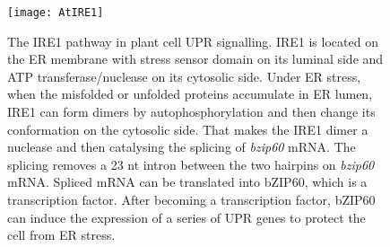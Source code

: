 \begin{figure}
	\centering
	\texttt{[image: AtIRE1]}
	\caption[The mode of IRE1 signalling pathway in Plant cell UPR.]
	{The IRE1 pathway in plant cell UPR signalling. IRE1 is located on the ER membrane with stress sensor domain on its luminal side and ATP transferase/nuclease on its cytosolic side. Under ER stress, when the misfolded or unfolded proteins accumulate in ER lumen, IRE1 can form dimers by autophosphorylation and then change its conformation on the cytosolic side. That makes the IRE1 dimer a nuclease and then catalysing the splicing of \textit{bzip60} mRNA. The splicing removes a 23 nt intron between the two hairpins on \textit{bzip60} mRNA. Spliced mRNA can be translated into bZIP60, which is a transcription factor. After becoming a transcription factor, bZIP60 can induce the expression of a series of UPR genes to protect the cell from ER stress.}
	\label{fig:AtIRE1_intro}
\end{figure}
